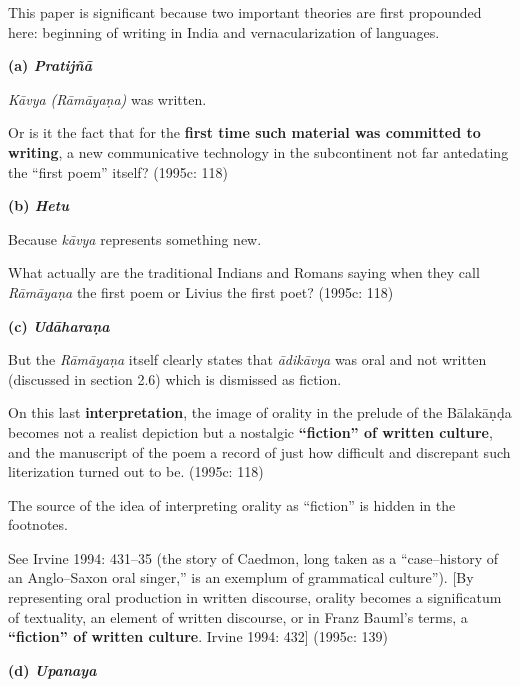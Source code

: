 This paper is significant because two important theories are first propounded here: beginning of writing in India and vernacularization of languages.

\textbf{(a) \textit{Pratijñā}}

\textit{Kāvya (Rāmāyaṇa)} was written.

\begin{myquote}
Or is it the fact that for the \textbf{first time such material was committed to writing}, a new communicative technology in the subcontinent not far antedating the “first poem” itself? (1995c: 118)
\end{myquote}

\textbf{(b) \textit{Hetu}}

Because\textit{ kāvya} represents something new.

\begin{myquote}
What actually are the traditional Indians and Romans saying when they call \textit{Rāmāyaṇa} the first poem or Livius the first poet? (1995c: 118)
\end{myquote}

\textbf{(c) \textit{Udāharaṇa}}

But the \textit{Rāmāyaṇa }itself clearly states that \textit{ādikāvya} was oral and not written (discussed in section 2.6) which is dismissed as fiction.

\begin{myquote}
On this last \textbf{interpretation}, the image of orality in the prelude of the Bālakāṇḍa becomes not a realist depiction but a nostalgic \textbf{“fiction” of written culture}, and the manuscript of the poem a record of just how difficult and discrepant such literization turned out to be. (1995c: 118)
\end{myquote}

The source of the idea of interpreting orality as “fiction” is hidden in the footnotes.

\begin{myquote}
See Irvine 1994: 431–35 (the story of Caedmon, long taken as a “case–history of an Anglo–Saxon oral singer,” is an exemplum of grammatical culture”). [By representing oral production in written discourse, orality becomes a significatum of textuality, an element of written discourse, or in Franz Bauml’s terms, a \textbf{“fiction” of written culture}. Irvine 1994: 432] (1995c: 139)
\end{myquote}

\textbf{(d) \textit{Upanaya}}

